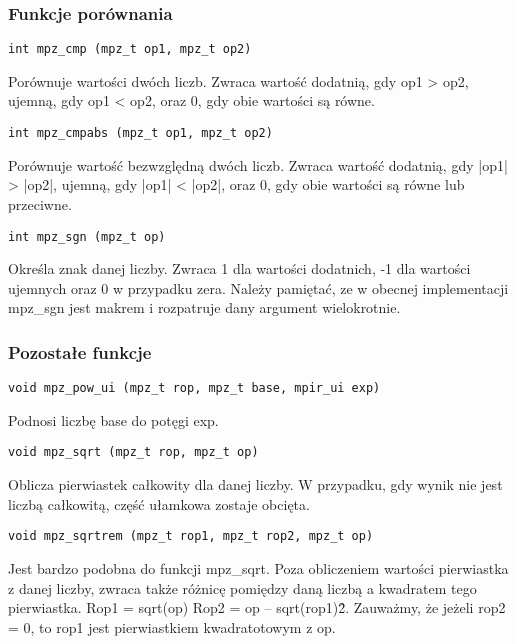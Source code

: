 \documentclass[twoside,a4paper]{book}
\begin{document}
\subsubsection{Funkcje porównania}

\begin{lstlisting}
int mpz_cmp (mpz_t op1, mpz_t op2)
\end{lstlisting}
Porównuje wartości dwóch liczb. Zwraca wartość dodatnią, gdy op1 > op2, ujemną, gdy op1 < op2, oraz 0, gdy obie wartości są równe.

\begin{lstlisting}
int mpz_cmpabs (mpz_t op1, mpz_t op2)
\end{lstlisting}
Porównuje wartość bezwzględną dwóch liczb. Zwraca wartość dodatnią, gdy |op1| > |op2|, ujemną, gdy |op1| < |op2|, oraz 0, gdy obie wartości są równe lub przeciwne.

\begin{lstlisting}
int mpz_sgn (mpz_t op)
\end{lstlisting}
Określa znak danej liczby. Zwraca 1 dla wartości dodatnich, -1 dla wartości ujemnych oraz 0 w przypadku zera. Należy pamiętać, ze w obecnej implementacji mpz\_sgn jest makrem i rozpatruje dany argument wielokrotnie.

\subsubsection{Pozostałe funkcje}

\begin{lstlisting}
void mpz_pow_ui (mpz_t rop, mpz_t base, mpir_ui exp)
\end{lstlisting}
Podnosi liczbę base do potęgi exp.

\begin{lstlisting}
void mpz_sqrt (mpz_t rop, mpz_t op)
\end{lstlisting}
Oblicza pierwiastek całkowity dla danej liczby. W przypadku, gdy wynik nie jest liczbą całkowitą, część ułamkowa zostaje obcięta.

\begin{lstlisting}
void mpz_sqrtrem (mpz_t rop1, mpz_t rop2, mpz_t op)
\end{lstlisting}
Jest bardzo podobna do funkcji mpz\_sqrt. Poza obliczeniem wartości pierwiastka z danej liczby, zwraca także różnicę pomiędzy daną liczbą a kwadratem tego pierwiastka.
Rop1 = sqrt(op)
Rop2 = op – sqrt(rop1)\^2.
Zauważmy, że jeżeli rop2 = 0, to rop1 jest pierwiastkiem kwadratotowym z op.
\end{document}
